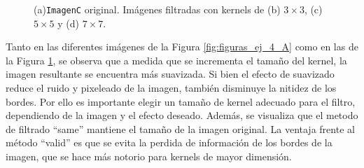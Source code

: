 \documentclass[11pt, twocolumn]{article}
\begin{document}
\begin{figure}[H]
  \centering
  \hfill
  \hfill
  \hfill
  \hfill
  \caption{(a)\texttt{ImagenC} original. Imágenes filtradas con kernels de (b) $3 \times 3$, (c) $5 \times 5$ y (d) $7 \times 7$.}
  \label{fig:figuras_ej_4_C}
\end{figure}

Tanto en las diferentes imágenes de la Figura \ref{fig:figuras_ej_4_A} como en las de la Figura \ref{fig:figuras_ej_4_C}, se observa que a medida que se incrementa el tamaño del kernel, la imagen resultante se encuentra más suavizada. Si bien el efecto de suavizado reduce el ruido y pixeleado de la imagen, también disminuye la nitidez de los bordes. Por ello es importante elegir un tamaño de kernel adecuado para el filtro, dependiendo de la imagen y el efecto deseado. Además, se visualiza que el metodo de filtrado ``same'' mantiene el tamaño de la imagen original. La ventaja frente al método ``valid'' es que se evita la perdida de información de los bordes de la imagen, que se hace más notorio para kernels de mayor dimensión.
\end{document}
